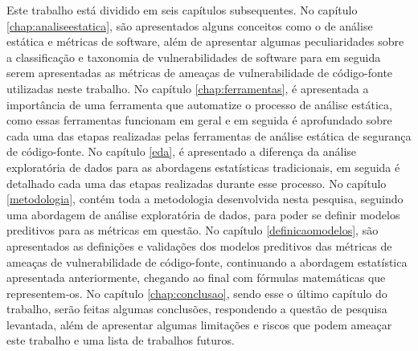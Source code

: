 Este trabalho está dividido em seis capítulos subsequentes. No capítulo
\ref{chap:analiseestatica}, são apresentados alguns conceitos como o de análise
estática e métricas de software, além de apresentar algumas peculiaridades sobre
a classificação e taxonomia de vulnerabilidades de software para em seguida
serem apresentadas as métricas de ameaças de vulnerabilidade de código-fonte
utilizadas neste trabalho. No capítulo \ref{chap:ferramentas}, é apresentada a
importância de uma ferramenta que automatize o processo de análise estática,
como essas ferramentas funcionam em geral e em seguida é aprofundado sobre cada
uma das etapas realizadas pelas ferramentas de análise estática de segurança de
código-fonte. No capítulo \ref{eda}, é apresentado a diferença da análise
exploratória de dados para as abordagens estatísticas tradicionais, em seguida é
detalhado cada uma das etapas realizadas durante esse processo. No capítulo
\ref{metodologia}, contém toda a metodologia desenvolvida nesta pesquisa,
seguindo uma abordagem de análise exploratória de dados, para poder se definir
modelos preditivos para as métricas em questão. No capítulo
\ref{definicaomodelos}, são apresentados as definições e validações dos modelos
preditivos das métricas de ameaças de vulnerabilidade de código-fonte,
continuando a abordagem estatística apresentada anteriormente, chegando ao final
com fórmulas matemáticas que representem-os. No capítulo \ref{chap:conclusao},
sendo esse o último capítulo do trabalho, serão feitas algumas conclusões,
respondendo a questão de pesquisa levantada, além de apresentar algumas
limitações e riscos que podem ameaçar este trabalho e uma lista de trabalhos
futuros.


